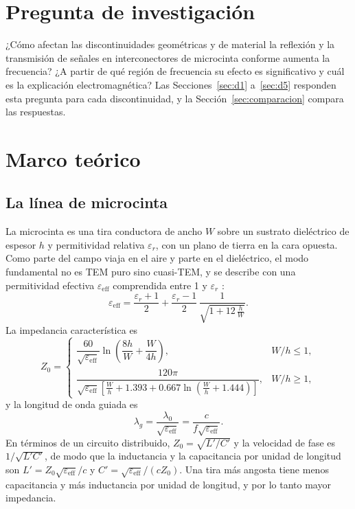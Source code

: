 \documentclass[11pt,letterpaper]{article}
\begin{document}
\section{Pregunta de investigación}
¿Cómo afectan las discontinuidades geométricas y de material la reflexión y la transmisión de señales en interconectores de microcinta conforme aumenta la frecuencia? ¿A partir de qué región de frecuencia su efecto es significativo y cuál es la explicación electromagnética? Las Secciones~\ref{sec:d1} a~\ref{sec:d5} responden esta pregunta para cada discontinuidad, y la Sección~\ref{sec:comparacion} compara las respuestas.

\section{Marco teórico}

\subsection{La línea de microcinta}
La microcinta es una tira conductora de ancho $W$ sobre un sustrato dieléctrico de espesor $h$ y permitividad relativa $\varepsilon_r$, con un plano de tierra en la cara opuesta. Como parte del campo viaja en el aire y parte en el dieléctrico, el modo fundamental no es TEM puro sino cuasi-TEM, y se describe con una permitividad efectiva $\varepsilon_{\mathrm{eff}}$ comprendida entre 1 y $\varepsilon_r$ \cite{pozar}:
\begin{equation}
\varepsilon_{\mathrm{eff}} = \frac{\varepsilon_r+1}{2} + \frac{\varepsilon_r-1}{2}\,\frac{1}{\sqrt{1+12\,\frac{h}{W}}}.
\label{eq:eeff}
\end{equation}
La impedancia característica es
\begin{equation}
Z_0 =
\begin{cases}
\dfrac{60}{\sqrt{\varepsilon_{\mathrm{eff}}}}\ln\!\left(\dfrac{8h}{W}+\dfrac{W}{4h}\right), & W/h\leq 1,\\[12pt]
\dfrac{120\pi}{\sqrt{\varepsilon_{\mathrm{eff}}}\left[\frac{W}{h}+1.393+0.667\ln\!\left(\frac{W}{h}+1.444\right)\right]}, & W/h\geq 1,
\end{cases}
\label{eq:z0}
\end{equation}
y la longitud de onda guiada es
\begin{equation}
\lambda_g = \frac{\lambda_0}{\sqrt{\varepsilon_{\mathrm{eff}}}} = \frac{c}{f\sqrt{\varepsilon_{\mathrm{eff}}}}.
\label{eq:lg}
\end{equation}
En términos de un circuito distribuido, $Z_0=\sqrt{L'/C'}$ y la velocidad de fase es $1/\sqrt{L'C'}$, de modo que la inductancia y la capacitancia por unidad de longitud son $L'=Z_0\sqrt{\varepsilon_{\mathrm{eff}}}/c$ y $C'=\sqrt{\varepsilon_{\mathrm{eff}}}/(cZ_0)$. Una tira más angosta tiene menos capacitancia y más inductancia por unidad de longitud, y por lo tanto mayor impedancia.
\end{document}

